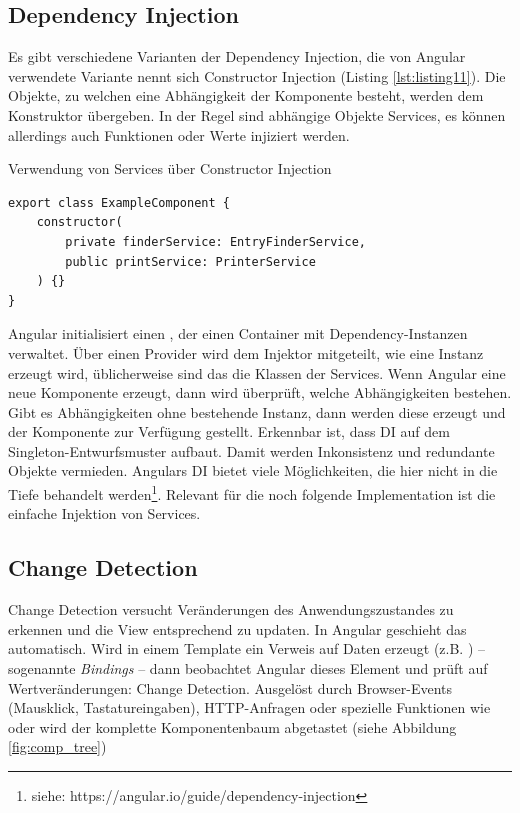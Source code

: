 \subsection{Dependency Injection}
Es gibt verschiedene Varianten der Dependency Injection, die von Angular verwendete Variante nennt sich Constructor Injection (Listing \ref{lst:listing11}). Die Objekte, zu welchen eine Abhängigkeit der Komponente besteht, werden dem Konstruktor übergeben. In der Regel sind abhängige Objekte Services, es können allerdings auch Funktionen oder Werte injiziert werden.

\begin{listing}
\caption{Verwendung von Services über Constructor Injection}
\label{lst:listing11}
\begin{verbatim}
export class ExampleComponent {
    constructor(
        private finderService: EntryFinderService,
        public printService: PrinterService
    ) {}
}
\end{verbatim}
\end{listing}

Angular initialisiert einen , der einen Container mit Dependency-Instanzen verwaltet. Über einen Provider wird dem Injektor mitgeteilt, wie eine Instanz erzeugt wird, üblicherweise sind das die Klassen der Services. Wenn Angular eine neue Komponente erzeugt, dann wird überprüft, welche Abhängigkeiten bestehen. Gibt es Abhängigkeiten ohne bestehende Instanz, dann werden diese erzeugt und der Komponente zur Verfügung gestellt. Erkennbar ist, dass DI auf dem Singleton-Entwurfsmuster aufbaut. Damit werden Inkonsistenz und redundante Objekte vermieden.
Angulars DI bietet viele Möglichkeiten, die hier nicht in die Tiefe behandelt werden\footnote{siehe: https://angular.io/guide/dependency-injection}. Relevant für die noch folgende Implementation ist die einfache Injektion von Services.\cite{ServiceDI}

\subsection{Change Detection}\label{ssec:change_detection}
Change Detection versucht Veränderungen des Anwendungszustandes zu erkennen und die View entsprechend zu updaten. In Angular geschieht das automatisch. Wird in einem Template ein Verweis auf Daten erzeugt (z.B. ) -- sogenannte \textit{Bindings} -- dann beobachtet Angular dieses Element und prüft auf Wertveränderungen: Change Detection. Ausgelöst durch Browser-Events (Mausklick, Tastatureingaben), HTTP-Anfragen oder spezielle Funktionen wie  oder  wird der komplette Komponentenbaum abgetastet (siehe Abbildung \ref{fig:comp_tree})

